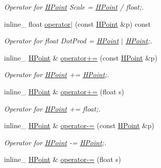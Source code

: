 \begin{DoxyCompactItemize}
\begin{DoxyCompactList}\small\item\em Operator for \hyperlink{class_h_point}{H\+Point} Scale = \hyperlink{class_h_point}{H\+Point} / float;. \end{DoxyCompactList}\item 
\hypertarget{class_h_point_a0303ae2cc164fd8ee05920637af64ad0}{inline\+\_\+ float \hyperlink{class_h_point_a0303ae2cc164fd8ee05920637af64ad0}{operator$\vert$} (const \hyperlink{class_h_point}{H\+Point} \&p) const }\label{class_h_point_a0303ae2cc164fd8ee05920637af64ad0}

\begin{DoxyCompactList}\small\item\em Operator for float Dot\+Prod = \hyperlink{class_h_point}{H\+Point} $\vert$ \hyperlink{class_h_point}{H\+Point};. \end{DoxyCompactList}\item 
\hypertarget{class_h_point_a790342c8074c1a8bc3e322b83ea363b1}{inline\+\_\+ \hyperlink{class_h_point}{H\+Point} \& \hyperlink{class_h_point_a790342c8074c1a8bc3e322b83ea363b1}{operator+=} (const \hyperlink{class_h_point}{H\+Point} \&p)}\label{class_h_point_a790342c8074c1a8bc3e322b83ea363b1}

\begin{DoxyCompactList}\small\item\em Operator for \hyperlink{class_h_point}{H\+Point} += \hyperlink{class_h_point}{H\+Point};. \end{DoxyCompactList}\item 
\hypertarget{class_h_point_a0b8c23b373a2cb54d42dafb6cd123414}{inline\+\_\+ \hyperlink{class_h_point}{H\+Point} \& \hyperlink{class_h_point_a0b8c23b373a2cb54d42dafb6cd123414}{operator+=} (float s)}\label{class_h_point_a0b8c23b373a2cb54d42dafb6cd123414}

\begin{DoxyCompactList}\small\item\em Operator for \hyperlink{class_h_point}{H\+Point} += float;. \end{DoxyCompactList}\item 
\hypertarget{class_h_point_a44ea2d9212a5b9af9a94f44524b8ef31}{inline\+\_\+ \hyperlink{class_h_point}{H\+Point} \& \hyperlink{class_h_point_a44ea2d9212a5b9af9a94f44524b8ef31}{operator-\/=} (const \hyperlink{class_h_point}{H\+Point} \&p)}\label{class_h_point_a44ea2d9212a5b9af9a94f44524b8ef31}

\begin{DoxyCompactList}\small\item\em Operator for \hyperlink{class_h_point}{H\+Point} -\/= \hyperlink{class_h_point}{H\+Point};. \end{DoxyCompactList}\item 
\hypertarget{class_h_point_ad0a7b9c76d96a76b42659de9d33b3930}{inline\+\_\+ \hyperlink{class_h_point}{H\+Point} \& \hyperlink{class_h_point_ad0a7b9c76d96a76b42659de9d33b3930}{operator-\/=} (float s)}\label{class_h_point_ad0a7b9c76d96a76b42659de9d33b3930}


\end{DoxyCompactItemize}
